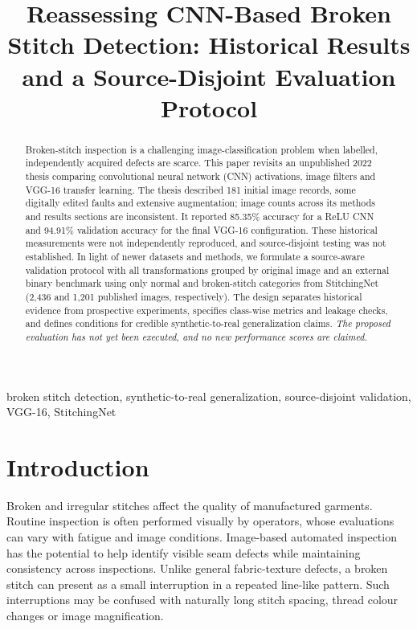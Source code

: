 \documentclass[conference,a4paper]{IEEEtran}
\begin{document}
\title{Reassessing CNN-Based Broken Stitch Detection: Historical Results and a Source-Disjoint Evaluation Protocol}
\author{} %
\maketitle
\begin{abstract}
Broken-stitch inspection is a challenging image-classification problem when labelled, independently acquired defects are scarce. This paper revisits an unpublished 2022 thesis comparing convolutional neural network (CNN) activations, image filters and VGG-16 transfer learning. The thesis described 181 initial image records, some digitally edited faults and extensive augmentation; image counts across its methods and results sections are inconsistent. It reported 85.35\% accuracy for a ReLU CNN and 94.91\% validation accuracy for the final VGG-16 configuration. These historical measurements were not independently reproduced, and source-disjoint testing was not established. In light of newer datasets and methods, we formulate a source-aware validation protocol with all transformations grouped by original image and an external binary benchmark using only normal and broken-stitch categories from StitchingNet (2,436 and 1,201 published images, respectively). The design separates historical evidence from prospective experiments, specifies class-wise metrics and leakage checks, and defines conditions for credible synthetic-to-real generalization claims. \emph{The proposed evaluation has not yet been executed, and no new performance scores are claimed.}
\end{abstract}
\begin{IEEEkeywords}
broken stitch detection, synthetic-to-real generalization, source-disjoint validation, VGG-16, StitchingNet
\end{IEEEkeywords}
\section{Introduction}
Broken and irregular stitches affect the quality of manufactured garments. Routine inspection is often performed visually by operators, whose evaluations can vary with fatigue and image conditions. Image-based automated inspection has the potential to help identify visible seam defects while maintaining consistency across inspections. Unlike general fabric-texture defects, a broken stitch can present as a small interruption in a repeated line-like pattern. Such interruptions may be confused with naturally long stitch spacing, thread colour changes or image magnification.
\end{document}
